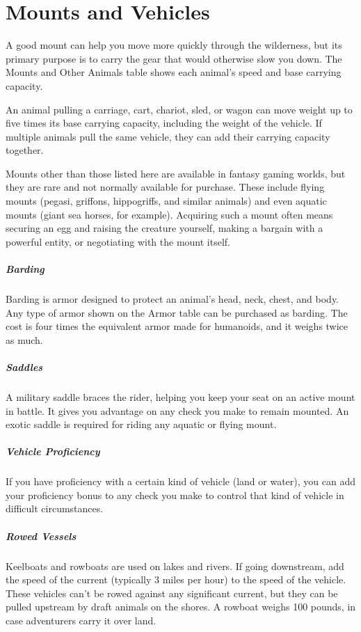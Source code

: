 \section{Mounts and Vehicles}

A good mount can help you move more quickly through the wilderness, but its primary purpose is to carry the gear that would otherwise slow you down. The Mounts and Other Animals table shows each animal's speed and base carrying capacity.

An animal pulling a carriage, cart, chariot, sled, or wagon can move weight up to five times its base carrying capacity, including the weight of the vehicle. If multiple animals pull the same vehicle, they can add their carrying capacity together.

Mounts other than those listed here are available in fantasy gaming worlds, but they are rare and not normally available for purchase. These include flying mounts (pegasi, griffons, hippogriffs, and similar animals) and even aquatic mounts (giant sea horses, for example). Acquiring such a mount often means securing an egg and raising the creature yourself, making a bargain with a powerful entity, or negotiating with the mount itself.

\subparagraph*{Barding} Barding is armor designed to protect an animal's head, neck, chest, and body. Any type of armor shown on the Armor table can be purchased as barding. The cost is four times the equivalent armor made for humanoids, and it weighs twice as much.

\subparagraph*{Saddles} A military saddle braces the rider, helping you keep your seat on an active mount in battle. It gives you advantage on any check you make to remain mounted. An exotic saddle is required for riding any aquatic or flying mount.

\subparagraph*{Vehicle Proficiency} If you have proficiency with a certain kind of vehicle (land or water), you can add your proficiency bonus to any check you make to control that kind of vehicle in difficult circumstances.

\subparagraph*{Rowed Vessels} Keelboats and rowboats are used on lakes and rivers. If going downstream, add the speed of the current (typically 3 miles per hour) to the speed of the vehicle. These vehicles can't be rowed against any significant current, but they can be pulled upstream by draft animals on the shores. A rowboat weighs 100 pounds, in case adventurers carry it over land.

